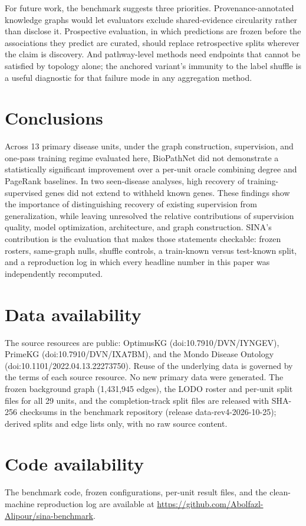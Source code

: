\documentclass[11pt]{article}
\begin{document}
For future work, the benchmark suggests three priorities. Provenance-annotated knowledge graphs would let evaluators exclude shared-evidence circularity rather than disclose it. Prospective evaluation, in which predictions are frozen before the associations they predict are curated, should replace retrospective splits wherever the claim is discovery. And pathway-level methods need endpoints that cannot be satisfied by topology alone; the anchored variant's immunity to the label shuffle is a useful diagnostic for that failure mode in any aggregation method.

\section{Conclusions}

Across 13 primary disease units, under the graph construction, supervision, and one-pass training regime evaluated here, BioPathNet did not demonstrate a statistically significant improvement over a per-unit oracle combining degree and PageRank baselines. In two seen-disease analyses, high recovery of training-supervised genes did not extend to withheld known genes. These findings show the importance of distinguishing recovery of existing supervision from generalization, while leaving unresolved the relative contributions of supervision quality, model optimization, architecture, and graph construction. SINA's contribution is the evaluation that makes those statements checkable: frozen rosters, same-graph nulls, shuffle controls, a train-known versus test-known split, and a reproduction log in which every headline number in this paper was independently recomputed.

\section*{Data availability}
The source resources are public: OptimusKG (doi:10.7910/DVN/IYNGEV), PrimeKG (doi:10.7910/DVN/IXA7BM), and the Mondo Disease Ontology (doi:10.1101/2022.04.13.22273750). Reuse of the underlying data is governed by the terms of each source resource. No new primary data were generated. The frozen background graph (1,431,945 edges), the LODO roster and per-unit split files for all 29 units, and the completion-track split files are released with SHA-256 checksums in the benchmark repository (release data-rev4-2026-10-25); derived splits and edge lists only, with no raw source content.

\section*{Code availability}
The benchmark code, frozen configurations, per-unit result files, and the clean-machine reproduction log are available at \url{https://github.com/Abolfazl-Alipour/sina-benchmark}.
\end{document}
